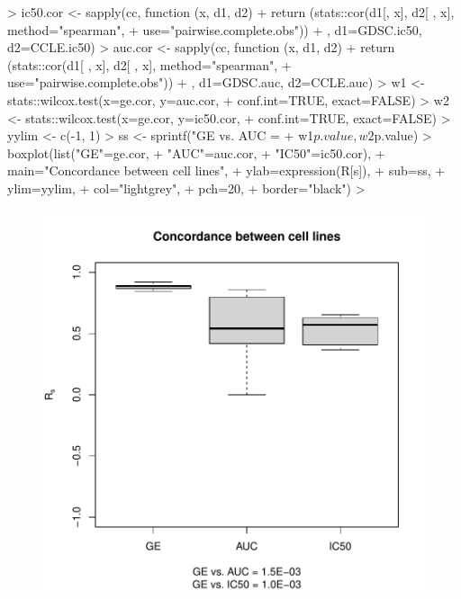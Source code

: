 \documentclass[11pt]{article}
\begin{document}
\begin{Schunk}
\begin{Sinput}
>   ic50.cor <- sapply(cc, function (x, d1, d2) {
+     return (stats::cor(d1[, x], d2[ , x], method="spearman",
+                 use="pairwise.complete.obs"))
+   }, d1=GDSC.ic50, d2=CCLE.ic50)
>   auc.cor <- sapply(cc, function (x, d1, d2) {
+     return (stats::cor(d1[ , x], d2[ , x], method="spearman",
+                 use="pairwise.complete.obs"))
+   }, d1=GDSC.auc, d2=CCLE.auc)
>   w1 <- stats::wilcox.test(x=ge.cor, y=auc.cor,
+                            conf.int=TRUE, exact=FALSE)
>   w2 <- stats::wilcox.test(x=ge.cor, y=ic50.cor,
+                            conf.int=TRUE, exact=FALSE)
>   yylim <- c(-1, 1)
>   ss <- sprintf("GE vs. AUC = %
+                 w1$p.value, w2$p.value)
>   boxplot(list("GE"=ge.cor,
+                "AUC"=auc.cor,
+                "IC50"=ic50.cor),
+           main="Concordance between cell lines",
+           ylab=expression(R[s]),
+           sub=ss,
+           ylim=yylim,
+           col="lightgrey",
+           pch=20,
+           border="black")
> 
\end{Sinput}
\end{Schunk}

\begin{figure}[hbtp]
\begin{center}
\includegraphics{PharmacoGx-fig2}
\end{center}
\label{fig:one}
\end{figure}
\end{document}
